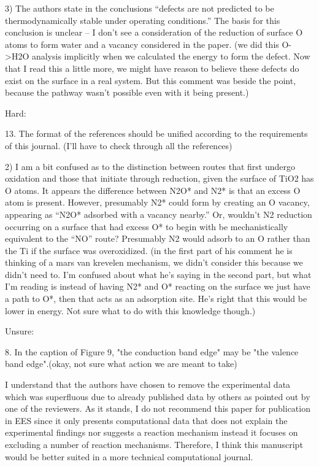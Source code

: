 3)      The authors state in the conclusions “defects are not predicted to be thermodynamically stable under operating conditions.”  The basis for this conclusion is unclear – I don’t see a consideration of the reduction of surface O atoms to form water and a vacancy considered in the paper. (we did this O->H2O analysis implicitly when we calculated the energy to form the defect. Now that I read this a little more, we might have reason to believe these defects do exist on the surface in a real system. But this comment was beside the point, because the pathway wasn't possible even with it being present.)

Hard:

13. The format of the references should be unified according to the requirements of this journal. (I'll have to check through all the references)

2)       I am a bit confused as to the distinction between routes that first undergo oxidation and those that initiate through reduction, given the surface of TiO2 has O atoms.  It appears the difference between N2O* and N2* is that an excess O atom is present.  However, presumably N2* could form by creating an O vacancy, appearing as “N2O* adsorbed with a vacancy nearby.”  Or, wouldn’t N2 reduction occurring on a surface that had excess O* to begin with be mechanistically equivalent to the “NO” route?  Presumably N2 would adsorb to an O rather than the Ti if the surface was overoxidized. (in the first part of his comment he is thinking of a mars van krevelen mechanism, we didn't consider this because we didn't need to. I'm confused about what he's saying in the second part, but what I'm reading is instead of having N2* and O* reacting on the surface we just have a path to O*, then that acts as an adsorption site. He's right that this would be lower in energy. Not sure what to do with this knowledge though.)



Unsure:

8. In the caption of Figure 9, "the conduction band edge" may be "the valence band edge".(okay, not sure what action we are meant to take)

I understand that the authors have chosen to remove the experimental data which was superfluous due to already published data by others as pointed out by one of the reviewers. As it stands, I do not recommend this paper for publication in EES since it only presents computational data that does not explain the experimental findings nor suggests a reaction mechanism instead it focuses on excluding a number of reaction mechanisms. Therefore, I think this manuscript would be better suited in a more technical computational journal.

